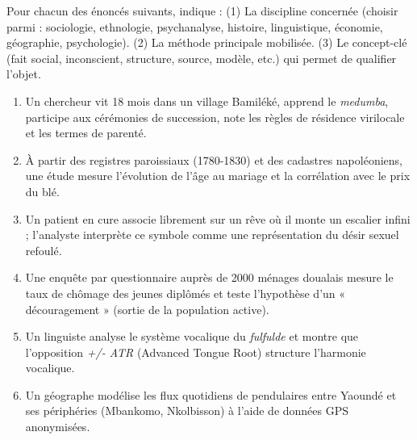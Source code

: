 \documentclass[11pt]{article}
\begin{document}
\begin{exercice}
Pour chacun des énoncés suivants, indique : (1) La discipline concernée (choisir parmi : sociologie, ethnologie, psychanalyse, histoire, linguistique, économie, géographie, psychologie). (2) La méthode principale mobilisée. (3) Le concept-clé (fait social, inconscient, structure, source, modèle, etc.) qui permet de qualifier l'objet.

\begin{enumerate}
    \item Un chercheur vit 18 mois dans un village Bamiléké, apprend le \emph{medumba}, participe aux cérémonies de succession, note les règles de résidence virilocale et les termes de parenté.
    \item À partir des registres paroissiaux (1780-1830) et des cadastres napoléoniens, une étude mesure l'évolution de l'âge au mariage et la corrélation avec le prix du blé.
    \item Un patient en cure associe librement sur un rêve où il monte un escalier infini ; l'analyste interprète ce symbole comme une représentation du désir sexuel refoulé.
    \item Une enquête par questionnaire auprès de 2000 ménages doualais mesure le taux de chômage des jeunes diplômés et teste l'hypothèse d'un « découragement » (sortie de la population active).
    \item Un linguiste analyse le système vocalique du \emph{fulfulde} et montre que l'opposition \emph{+/- ATR} (Advanced Tongue Root) structure l'harmonie vocalique.
    \item Un géographe modélise les flux quotidiens de pendulaires entre Yaoundé et ses périphéries (Mbankomo, Nkolbisson) à l'aide de données GPS anonymisées.
\end{enumerate}
\end{exercice}
\end{document}

